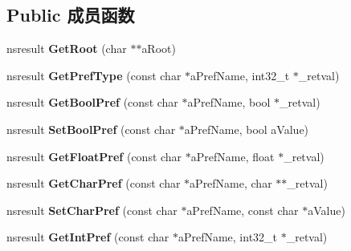 \subsection*{Public 成员函数}
\begin{DoxyCompactItemize}
\item 
\mbox{\label{interfacens_i_pref_branch_a8c1be3e4126cc643b724eea12099e386}} 
nsresult {\bfseries Get\+Root} (char $\ast$$\ast$a\+Root)
\item 
\mbox{\label{interfacens_i_pref_branch_a7415c9d99eef5f36a46c3e5f340ffcac}} 
nsresult {\bfseries Get\+Pref\+Type} (const char $\ast$a\+Pref\+Name, int32\+\_\+t $\ast$\+\_\+retval)
\item 
\mbox{\label{interfacens_i_pref_branch_ac06349fb3beb1a741b3cd876d85318d3}} 
nsresult {\bfseries Get\+Bool\+Pref} (const char $\ast$a\+Pref\+Name, bool $\ast$\+\_\+retval)
\item 
\mbox{\label{interfacens_i_pref_branch_a7dbbad47c8ce94916b77e164c5440d0c}} 
nsresult {\bfseries Set\+Bool\+Pref} (const char $\ast$a\+Pref\+Name, bool a\+Value)
\item 
\mbox{\label{interfacens_i_pref_branch_ab416e40b19498de0723219d948a3f4dd}} 
nsresult {\bfseries Get\+Float\+Pref} (const char $\ast$a\+Pref\+Name, float $\ast$\+\_\+retval)
\item 
\mbox{\label{interfacens_i_pref_branch_af3a6e4d6103b4ba6337527cc733dc5bd}} 
nsresult {\bfseries Get\+Char\+Pref} (const char $\ast$a\+Pref\+Name, char $\ast$$\ast$\+\_\+retval)
\item 
\mbox{\label{interfacens_i_pref_branch_af9bb6269c44f15ca222399271d999ce2}} 
nsresult {\bfseries Set\+Char\+Pref} (const char $\ast$a\+Pref\+Name, const char $\ast$a\+Value)
\item 
\mbox{\label{interfacens_i_pref_branch_a52fcc1220cfac2ce4d31e849d86f56fe}} 
nsresult {\bfseries Get\+Int\+Pref} (const char $\ast$a\+Pref\+Name, int32\+\_\+t $\ast$\+\_\+retval)
\item 

\end{DoxyCompactItemize}

